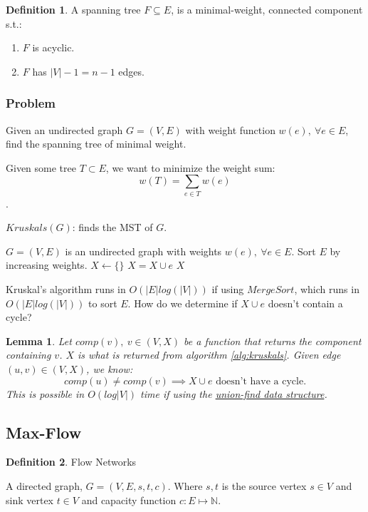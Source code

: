 \documentclass{article}
\newtheorem{lemma}[theorem]{Lemma}
\theoremstyle{definition}
\newtheorem{definition}{Definition}[section]
\begin{document}
\begin{definition}
A spanning tree $F \subseteq E$, is a minimal-weight, connected component s.t.:
\begin{enumerate}
	\item $F$ is acyclic. 
	\item $F$ has $|V|-1=n-1$ edges.
\end{enumerate}
\end{definition}

\subsubsection{Problem}
Given an undirected graph $G = (V,E)$ with weight function $w(e),\: \forall e \in E$, find the spanning tree of minimal weight. 

Given some tree $T \subset E$, we want to minimize the weight sum: $$w(T) = \sum_{e \in T}w(e)$$.

\begin{algorithm}
	\caption{$Kruskals(G)$: finds the MST of $G$.}
	\label{alg:kruskals}
	\begin{algorithmic}[1]
		\REQUIRE $G=(V,E)$ is an undirected graph with weights $w(e), \: \forall e \in E$.
		\STATE Sort $E$ by increasing weights. 
		\STATE $X \gets \{\}$
			\STATE $X = X \cup e$
		\ENDIF
		\ENDFOR
		\RETURN $X$
	\end{algorithmic}
\end{algorithm}

Kruskal's algorithm runs in $O(|E|log(|V|))$ if using $MergeSort$, which runs in $O(|E|log(|V|))$ to sort $E$. How do we determine if $X \cup e$ doesn't contain a cycle? 

\begin{lemma}
	Let $comp(v), \: v \in (V,X)$ be a function that returns the component containing $v$. $X$ is what is returned from algorithm \ref{alg:kruskals}. Given edge $(u,v) \in (V,X)$, we know:
	$$comp(u) \neq comp(v) \implies X \cup e \text{ doesn't have a cycle.}$$
	This is possible in $O(log|V|)$ time if using the \href{https://en.wikipedia.org/wiki/Disjoint-set_data_structure}{union-find data structure}.
\end{lemma}

\subsection{Max-Flow}
\begin{definition}{Flow Networks}
\label{def:flow_networks}

A directed graph, $G = (V, E, s, t, c)$. Where $s, t$ is the source vertex $s \in V$ and sink vertex $t \in V$ and capacity function $c:E \mapsto \mathbb{N}$.
\end{definition}
\end{document}
